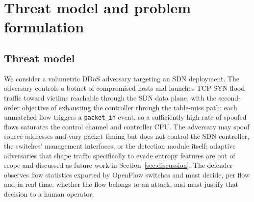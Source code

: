 ﻿\documentclass[review,12pt]{elsarticle}
\begin{document}
\begin{table}[!t]
\centering
\caption{Qualitative comparison of XAI-SDN with representative prior approaches.}
\label{tab:relwork}
\small
\setlength{\tabcolsep}{4.5pt}
\end{table}

\section{Threat model and problem formulation}
\label{sec:threat}

\subsection{Threat model}
We consider a volumetric DDoS adversary targeting an SDN deployment. The adversary controls a botnet of compromised hosts and launches TCP SYN flood traffic toward victims reachable through the SDN data plane, with the second-order objective of exhausting the controller through the table-miss path: each unmatched flow triggers a \texttt{packet\_in} event, so a sufficiently high rate of spoofed flows saturates the control channel and controller CPU. The adversary may spoof source addresses and vary packet timing but does not control the SDN controller, the switches' management interfaces, or the detection module itself; adaptive adversaries that shape traffic specifically to evade entropy features are out of scope and discussed as future work in Section~\ref{sec:discussion}. The defender observes flow statistics exported by OpenFlow switches and must decide, per flow and in real time, whether the flow belongs to an attack, and must justify that decision to a human operator.
\end{document}
